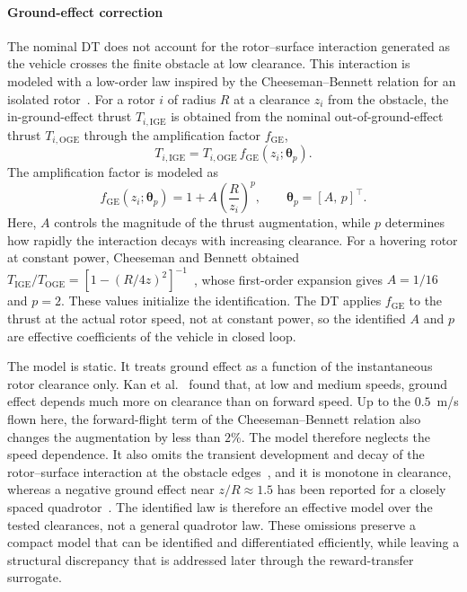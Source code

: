 \documentclass[journal]{IEEEtran}
\begin{document}
\paragraph*{Ground-effect correction}
\label{sec:ge-model}
The nominal DT does not account for the rotor--surface interaction generated as the vehicle crosses the finite obstacle at low clearance. This interaction is modeled with a low-order law inspired by the Cheeseman--Bennett relation for an isolated rotor~\cite{CheesemanBennett1955}. For a rotor $i$ of radius $R$ at a clearance $z_i$ from the obstacle, the in-ground-effect thrust $T_{i,\mathrm{IGE}}$ is obtained from the nominal out-of-ground-effect thrust $T_{i,\mathrm{OGE}}$ through the amplification factor $f_{\mathrm{GE}}$,
\begin{equation}
 T_{i,\mathrm{IGE}}
 =T_{i,\mathrm{OGE}}\,
 f_{\mathrm{GE}}(z_i;\boldsymbol{\theta}_p).
 \label{eq:ge-thrust-factor}
\end{equation}
The amplification factor is modeled as
\begin{equation}
 f_{\mathrm{GE}}(z_i;\boldsymbol{\theta}_p)=1+A\left(\frac{R}{z_i}\right)^p,
 \qquad \boldsymbol{\theta}_p=[A,\,p]^\top .
 \label{eq:fge}
\end{equation}
Here, $A$ controls the magnitude of the thrust augmentation, while $p$ determines how rapidly the interaction decays with increasing clearance. For a hovering rotor at constant power, Cheeseman and Bennett obtained $T_{\mathrm{IGE}}/T_{\mathrm{OGE}}=[1-(R/4z)^2]^{-1}$~\cite{CheesemanBennett1955}, whose first-order expansion gives $A=1/16$ and $p=2$. These values initialize the identification. The DT applies $f_{\mathrm{GE}}$ to the thrust at the actual rotor speed, not at constant power, so the identified $A$ and $p$ are effective coefficients of the vehicle in closed loop.

The model is static. It treats ground effect as a function of the instantaneous rotor clearance only. Kan et al.~\cite{Kan2019} found that, at low and medium speeds, ground effect depends much more on clearance than on forward speed. Up to the $0.5$~m/s flown here, the forward-flight term of the Cheeseman--Bennett relation also changes the augmentation by less than $2\%$. The model therefore neglects the speed dependence. It also omits the transient development and decay of the rotor--surface interaction at the obstacle edges~\cite{Curtiss1984}, and it is monotone in clearance, whereas a negative ground effect near $z/R\approx1.5$ has been reported for a closely spaced quadrotor~\cite{Lei2026}. The identified law is therefore an effective model over the tested clearances, not a general quadrotor law. These omissions preserve a compact model that can be identified and differentiated efficiently, while leaving a structural discrepancy that is addressed later through the reward-transfer surrogate.
\end{document}
